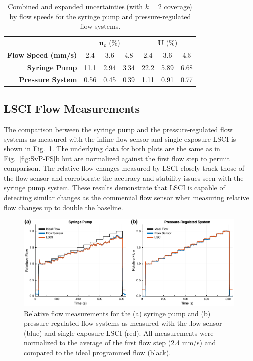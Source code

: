 \documentclass[12pt]{spieman}
\begin{document}
\begin{spacing}{2}
\begin{table}
    \caption {
        Combined and expanded uncertainties (with $k=2$ coverage) by flow speeds for the syringe pump and pressure-regulated flow systems.
    }
    \label{tab:uncertainty_combined}
    \centering
    \begin{tabular}{rcccccc}
        \addlinespace
        \toprule
            &
            \multicolumn{3}{c}{$\boldsymbol{u_c}$ (\%)}     &
            \multicolumn{3}{c}{$\boldsymbol{U}$ (\%)}       \\
            \cmidrule(lr){2-4}
            \cmidrule(lr){5-7}
        \textbf{Flow Speed (mm/s)} & 2.4    & 3.6   & 4.8   & 2.4   & 3.6   & 4.8   \\
        \midrule
        \textbf{Syringe Pump}      & 11.1   & 2.94  & 3.34  & 22.2  & 5.89  & 6.68  \\
        \textbf{Pressure System}   & 0.56   & 0.45  & 0.39  & 1.11  & 0.91  & 0.77  \\
        \bottomrule
    \end{tabular}
\end{table}


\subsection{LSCI Flow Measurements}

The comparison between the syringe pump and the pressure-regulated flow systems as measured with the inline flow sensor and single-exposure LSCI is shown in Fig.~\ref{fig:SvP-FS_LSCI}. The underlying data for both plots are the same as in Fig.~\ref{fig:SvP-FS}b but are normalized against the first flow step to permit comparison. The relative flow changes measured by LSCI closely track those of the flow sensor and corroborate the accuracy and stability issues seen with the syringe pump system. These results demonstrate that LSCI is capable of detecting similar changes as the commercial flow sensor when measuring relative flow changes up to double the baseline. 

\begin{figure}
    \includegraphics[width=\textwidth]{Figure5.pdf}
    \caption {
        Relative flow measurements for the (a) syringe pump and (b) pressure-regulated flow systems as measured with the flow sensor (blue) and single-exposure LSCI (red). All measurements were normalized to the average of the first flow step (2.4 mm/s) and compared to the ideal programmed flow (black).
    }
    \label{fig:SvP-FS_LSCI}
\end{figure}



\end{spacing}
\end{document}
